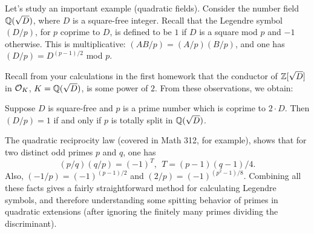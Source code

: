 Let's study an important example (quadratic fields).
Consider the number field $\mathbb{Q}(\sqrt{D})$, where $D$ is a square-free integer.
Recall that the Legendre symbol $(D/p)$, for $p$ coprime to $D$, is defined to be $1$ if $D$ is a square mod $p$ and $-1$ otherwise.
This is multiplicative: $(AB/p) = (A/p)(B/p)$, and one has $(D/p) = D^{(p-1)/2}$ mod $p$.

Recall from your calculations in the first homework that the conductor of $\mathbb{Z}[\sqrt{D}]$ in $\mathcal{O}_{K}$, $K = \mathbb{Q}(\sqrt{D})$, is some power of $2$.
From these observations, we obtain:
\begin{proposition}
  Suppose $D$ is square-free and $p$ is a prime number which is coprime to $2 \cdot D$.
  Then $(D/p) = 1$ if and only if $p$ is totally split in $\mathbb{Q}(\sqrt{D})$.
\end{proposition}

The quadratic reciprocity law (covered in Math 312, for example), shows that for two distinct odd primes $p$ and $q$, one has
\[ (p/q)(q/p) = (-1)^{T}, \ \ T = (p-1)(q-1)/4. \]
Also, $(-1/p) = (-1)^{(p-1)/2}$ and $(2/p) = (-1)^{(p^{2}-1)/8}$.
Combining all these facts gives a fairly straightforward method for calculating Legendre symbols, and therefore understanding some spitting behavior of primes in quadratic extensions (after ignoring the finitely many primes dividing the discriminant).

